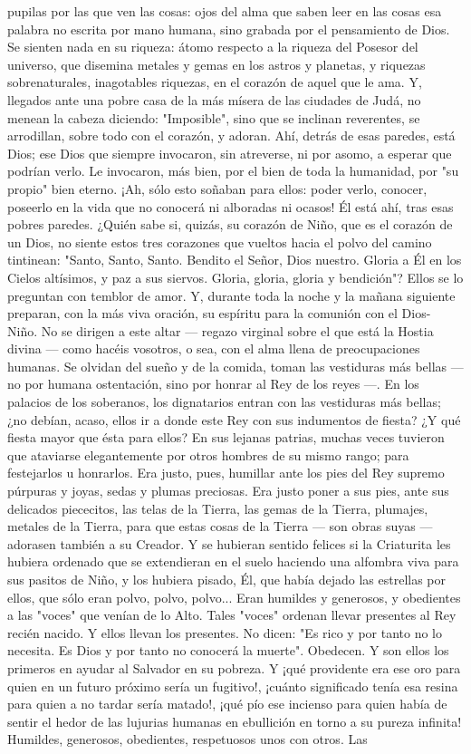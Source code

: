 \documentclass[12pt, twoside, openright]{book} %
\begin{document}
pupilas por las que ven las cosas: ojos del alma que saben leer en las cosas esa palabra no escrita por mano humana, sino grabada por el pensamiento de Dios. Se sienten nada en su riqueza: átomo respecto a la riqueza del Posesor del universo, que disemina metales y gemas en los astros y planetas, y riquezas sobrenaturales, inagotables riquezas, en el corazón de aquel que le ama. Y, llegados ante una pobre casa de la más mísera de las ciudades de Judá, no menean la cabeza diciendo: "Imposible", sino que se inclinan reverentes, se arrodillan, sobre todo con el corazón, y adoran. Ahí, detrás de esas paredes, está Dios; ese Dios que siempre invocaron, sin atreverse, ni por asomo, a esperar que podrían verlo. Le invocaron, más bien, por el bien de toda la humanidad, por "su propio" bien eterno. ¡Ah, sólo esto soñaban para ellos: poder verlo, conocer, poseerlo en la vida que no conocerá ni alboradas ni ocasos! Él está ahí, tras esas pobres paredes. ¿Quién sabe si, quizás, su corazón de Niño, que es el corazón de un Dios, no siente estos tres corazones que vueltos hacia el polvo del camino tintinean: "Santo, Santo, Santo. Bendito el Señor, Dios nuestro. Gloria a Él en los Cielos altísimos, y paz a sus siervos. Gloria, gloria, gloria y bendición"? Ellos se lo preguntan con temblor de amor. Y, durante toda la noche y la mañana siguiente preparan, con la más viva oración, su espíritu para la comunión con el Dios- Niño. No se dirigen a este altar — regazo virginal sobre el que está la Hostia divina — como hacéis vosotros, o sea, con el alma llena de preocupaciones humanas. Se olvidan del sueño y de la comida, toman las vestiduras más bellas — no por humana ostentación, sino por honrar al Rey de los reyes —. En los palacios de los soberanos, los dignatarios entran con las vestiduras más bellas; ¿no debían, acaso, ellos ir a donde este Rey con sus indumentos de fiesta? ¿Y qué fiesta mayor que ésta para ellos? En sus lejanas patrias, muchas veces tuvieron que ataviarse elegantemente por otros hombres de su mismo rango; para festejarlos u honrarlos. Era justo, pues, humillar ante los pies del Rey supremo púrpuras y joyas, sedas y plumas preciosas. Era justo poner a sus pies, ante sus delicados piececitos, las telas de la Tierra, las gemas de la Tierra, plumajes, metales de la Tierra, para que estas cosas de la Tierra — son obras suyas — adorasen también a su Creador. Y se hubieran sentido felices si la Criaturita les hubiera ordenado que se extendieran en el suelo haciendo una alfombra viva para sus pasitos de Niño, y los hubiera pisado, Él, que había dejado las estrellas por ellos, que sólo eran polvo, polvo, polvo... Eran humildes y generosos, y obedientes a las "voces" que venían de lo Alto. Tales "voces" ordenan llevar presentes al Rey recién nacido. Y ellos llevan los presentes. No dicen: "Es rico y por tanto no lo necesita. Es Dios y por tanto no conocerá la muerte". Obedecen. Y son ellos los primeros en ayudar al Salvador en su pobreza. Y ¡qué providente era ese oro para quien en un futuro próximo sería un fugitivo!, ¡cuánto significado tenía esa resina para quien a no tardar sería matado!, ¡qué pío ese incienso para quien había de sentir el hedor de las lujurias humanas en ebullición en torno a su pureza infinita! Humildes, generosos, obedientes, respetuosos unos con otros. Las 
\end{document}

